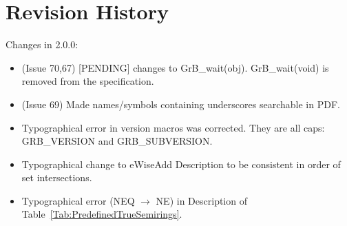 \chapter{Revision History}
\label{Chp:RevHistory}

Changes in 2.0.0:
\begin{itemize}
\item (Issue 70,67) [PENDING] changes to {\sf GrB\_wait(obj)}. {\sf GrB\_wait(void)} is removed from the specification.
\item (Issue 69) Made names/symbols containing underscores searchable in PDF.
\item Typographical error in version macros was corrected.  They are all caps: {\sf GRB\_VERSION} and {\sf GRB\_SUBVERSION}.
\item Typographical change to eWiseAdd Description to be consistent in order of set intersections.
\item Typographical error ({\sf NEQ} $\rightarrow$ {\sf NE}) in Description of Table~\ref{Tab:PredefinedTrueSemirings}.
\end{itemize}


